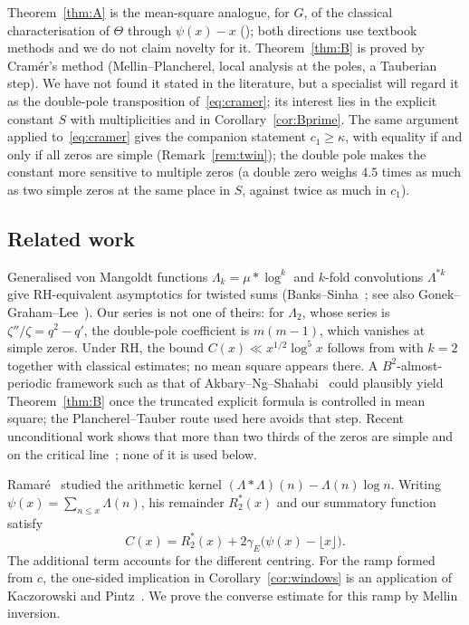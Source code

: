 \documentclass[11pt]{amsart}
\theoremstyle{remark}
\theoremstyle{definition}
\newcommand{\Lam}{\Lambda}
\newcommand{\gE}{\gamma_E}
\begin{document}
Theorem~\ref{thm:A} is the mean-square analogue, for $G$, of the classical characterisation of $\Theta$ through $\psi(x)-x$ (\cite[Ch.~13 and 15]{MV07}); both directions use textbook methods and we do not claim novelty for it. Theorem~\ref{thm:B} is proved by Cram\'er's method (Mellin--Plancherel, local analysis at the poles, a Tauberian step). We have not found it stated in the literature, but a specialist will regard it as the double-pole transposition of~\eqref{eq:cramer}; its interest lies in the explicit constant $S$ with multiplicities and in Corollary~\ref{cor:Bprime}. The same argument applied to~\eqref{eq:cramer} gives the companion statement $c_1\ge\kappa$, with equality if and only if all zeros are simple (Remark~\ref{rem:twin}); the double pole makes the constant more sensitive to multiple zeros (a double zero weighs $4.5$ times as much as two simple zeros at the same place in $S$, against twice as much in $c_1$).

\subsection*{Related work} Generalised von Mangoldt functions $\Lam_k=\mu*\log^k$ and $k$-fold convolutions $\Lam^{*k}$ give RH-equivalent asymptotics for twisted sums (Banks--Sinha~\cite{BS22}; see also Gonek--Graham--Lee~\cite{GGL20}). Our series is not one of theirs: for $\Lam_2$, whose series is $\zeta''/\zeta=q^2-q'$, the double-pole coefficient is $m(m-1)$, which vanishes at simple zeros. Under RH, the bound $C(x)\ll x^{1/2}\log^5x$ follows from \cite[Thm.~1.1]{BS22} with $k=2$ together with classical estimates; no mean square appears there. A $B^2$-almost-periodic framework such as that of Akbary--Ng--Shahabi~\cite{ANS14} could plausibly yield Theorem~\ref{thm:B} once the truncated explicit formula is controlled in mean square; the Plancherel--Tauber route used here avoids that step. Recent unconditional work shows that more than two thirds of the zeros are simple and on the critical line~\cite{AF26,Lam26}; none of it is used below.

Ramar\'e~\cite[\S6, (6.1)]{Ram13} studied the arithmetic kernel
$(\Lam*\Lam)(n)-\Lam(n)\log n$. Writing $\psi(x)=\sum_{n\le x}\Lam(n)$,
his remainder $R_2^*(x)$ and our summatory function satisfy
\[
 C(x)=R_2^*(x)+2\gE\bigl(\psi(x)-\lfloor x\rfloor\bigr).
\]
The additional term accounts for the different centring. For the ramp
formed from $c$, the one-sided implication in Corollary~\ref{cor:windows}
is an application of Kaczorowski and Pintz~\cite{KP86}. We prove the
converse estimate for this ramp by Mellin inversion.
\end{document}
